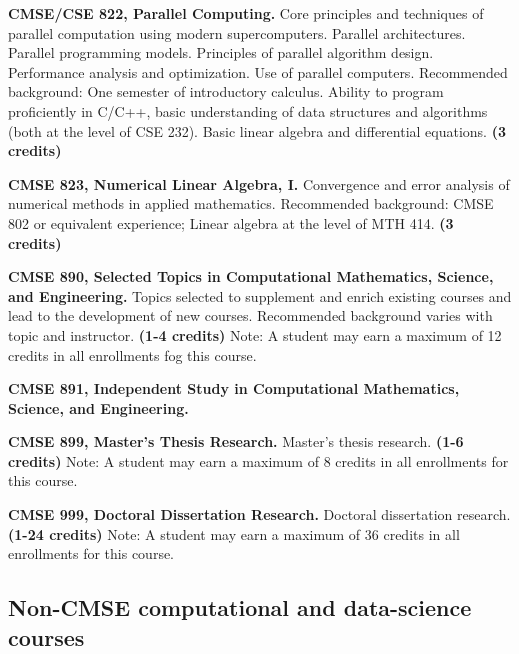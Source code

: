 \vspace{3mm}
\noindent\textbf{CMSE/CSE 822, Parallel Computing.}  Core principles and techniques of parallel computation using modern supercomputers. Parallel architectures. Parallel programming models. Principles of parallel algorithm design. Performance analysis and optimization. Use of parallel computers.  Recommended background: One semester of introductory calculus. Ability to program proficiently in C/C++, basic understanding of data structures and algorithms (both at the level of CSE 232). Basic linear algebra and differential equations.  \textbf{(3 credits)}

\vspace{3mm}
\noindent\textbf{CMSE 823, Numerical Linear Algebra, I.}  Convergence and error analysis of numerical methods in applied mathematics.  Recommended background: CMSE 802 or equivalent experience; Linear algebra at the level of MTH 414. \textbf{(3 credits)}

\vspace{3mm}
\noindent\textbf{CMSE 890, Selected Topics in Computational Mathematics, Science, and Engineering.}  Topics selected to supplement and enrich existing courses and lead to the development of new courses.  Recommended background varies with topic and instructor.  \textbf{(1-4 credits)}  Note: A student may earn a maximum of 12 credits in all enrollments fog this course.

\vspace{3mm}
\noindent\textbf{CMSE 891, Independent Study in Computational Mathematics, Science, and Engineering.}  

\vspace{3mm}
\noindent\textbf{CMSE 899, Master's Thesis Research.}  Master's thesis research.  \textbf{(1-6 credits)}  Note: A student may earn a maximum of 8 credits in all enrollments for this course.

\vspace{3mm}
\noindent\textbf{CMSE 999, Doctoral Dissertation Research.}  Doctoral dissertation research.  \textbf{(1-24 credits)}   Note: A student may earn a maximum of 36 credits in all enrollments for this course.

\vspace{3mm}

\subsection{Non-CMSE computational and data-science courses}

